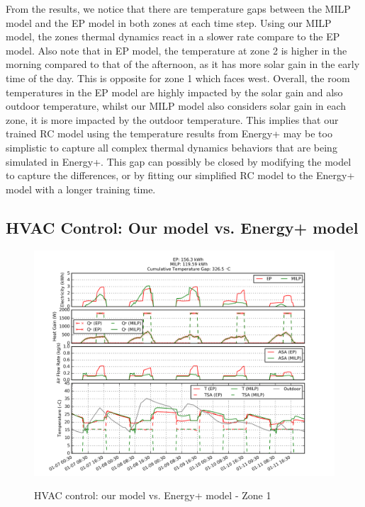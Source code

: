 From the results, we notice that there are temperature gaps between the MILP model and the EP model in both zones at each time step. Using our MILP model, the zones thermal dynamics react in a slower rate compare to the EP model. Also note that in EP model, the temperature at zone 2 is higher in the morning compared to that of the afternoon, as it has more solar gain in the early time of the day. This is opposite for zone 1 which faces west. Overall, the room temperatures in the EP model are highly impacted by the solar gain and also outdoor temperature, whilst our MILP model also considers solar gain in each zone, it is more impacted by the outdoor temperature.
This implies that our trained RC model using the temperature results from Energy+ may be too simplistic to capture all complex thermal dynamics behaviors that are being simulated in Energy+. This gap can possibly be closed by modifying the model to capture the differences, or by fitting our simplified RC model to the Energy+ model with a longer training time. %


\subsection{HVAC Control: Our model vs. Energy+ model}

\begin{figure} [h]
\centering
  \includegraphics[width=0.8\linewidth]{figs/app_2R_hvac_13-17_R1R2_D7-12_2R_R0.png} \\
\caption{HVAC control: our model vs. Energy+ model - Zone 1}
\label{fig:compare_ctrl_z1}
\end{figure}

